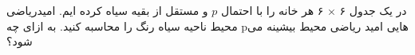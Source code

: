 \problem{}
در یک جدول ۶ × ۶ هر خانه را با احتمال
 $p$
و مستقل از بقیه سیاه کرده ایم.
\newline
\subproblem
امیدریاضی محیط ناحیه سیاه رنگ را محاسبه کنید.
\newline
\subproblem
به ازای چه pهایی امید ریاضی محیط بیشینه می شود؟